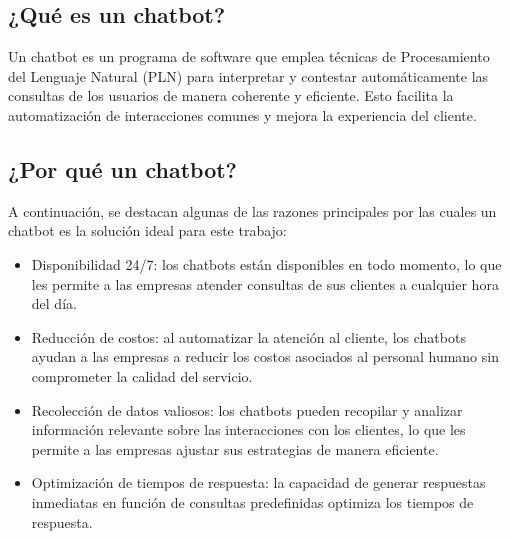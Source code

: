 \subsection{¿Qué es un chatbot?}

Un chatbot es un programa de software que emplea técnicas de Procesamiento del Lenguaje Natural (PLN) \citep{ibm-pln} para interpretar y contestar automáticamente las consultas de los usuarios de manera coherente y eficiente. Esto facilita la automatización de interacciones comunes y mejora la experiencia del cliente.


\subsection{¿Por qué un chatbot?}

A continuación, se destacan algunas de las razones principales por las cuales un chatbot es la solución ideal para este trabajo:

\begin{itemize}
    \item Disponibilidad 24/7: los chatbots están disponibles en todo momento, lo que les permite a las empresas atender consultas de sus clientes a cualquier hora del día.
    
    \item Reducción de costos: al automatizar la atención al cliente, los chatbots ayudan a las empresas a reducir los costos asociados al personal humano sin comprometer la calidad del servicio.
    
    \item Recolección de datos valiosos: los chatbots pueden recopilar y analizar información relevante sobre las interacciones con los clientes, lo que les permite a las empresas ajustar sus estrategias de manera eficiente.
    
    \item Optimización de tiempos de respuesta: la capacidad de generar respuestas inmediatas en función de consultas predefinidas optimiza los tiempos de respuesta.
\end{itemize}




